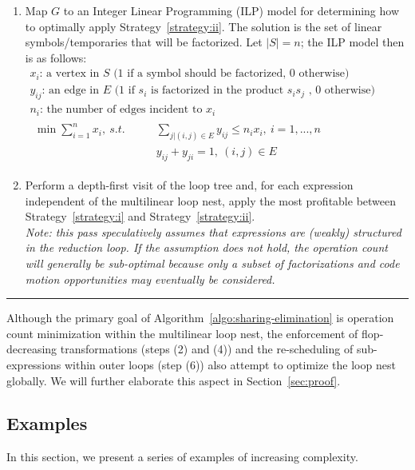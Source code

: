 \begin{Algo}
\begin{enumerate}
\item Map $G$ to an Integer Linear Programming (ILP) model for determining how to optimally apply Strategy~\ref{strategy:ii}. The solution is the set of linear symbols/temporaries that will be factorized. Let $|S| = n$; the ILP model then is as follows:
\begin{gather*}
x_i \text{: a vertex in } S \text{ (1 if a symbol should be factorized, 0 otherwise)}\\
y_{ij} \text{: an edge in } E \text{ (1 if } s_i \text{ is factorized in the product } s_i s_j \text{ , 0 otherwise)}\\
n_i \text{: the number of edges incident to } x_i \\
\begin{align*}
\min \sum_{i=1}^{n} x_i,\ s.t. ~~~~~~~~~&\sum_{j|(i,j) \in E} y_{ij} \leq n_i x_i,\ i = 1, ..., n \\
& y_{ij} + y_{ji} = 1,\ (i, j) \in E
\end{align*}
\phantom{\hspace{6cm}}
\end{gather*}


\item Perform a depth-first visit of the loop tree and, for each expression independent of the multilinear loop nest, apply the most profitable between Strategy~\ref{strategy:i} and Strategy~\ref{strategy:ii}. \\
\textit{Note: this pass speculatively assumes that expressions are (weakly) structured in the reduction loop. If the assumption does not hold, the operation count will generally be sub-optimal because only a subset of factorizations and code motion opportunities may eventually be considered.}
\end{enumerate}
\end{Algo}

\noindent\rule[1.0ex]{\linewidth}{0.7pt}

Although the primary goal of Algorithm~\ref{algo:sharing-elimination} is operation count minimization within the multilinear loop nest, the enforcement of flop-decreasing transformations (steps (2) and (4)) and the re-scheduling of sub-expressions within outer loops (step (6)) also attempt to optimize the loop nest globally. We will further elaborate this aspect in Section~\ref{sec:proof}.


\subsection{Examples}
\label{sec:se-examples}
In this section, we present a series of examples of increasing complexity.

